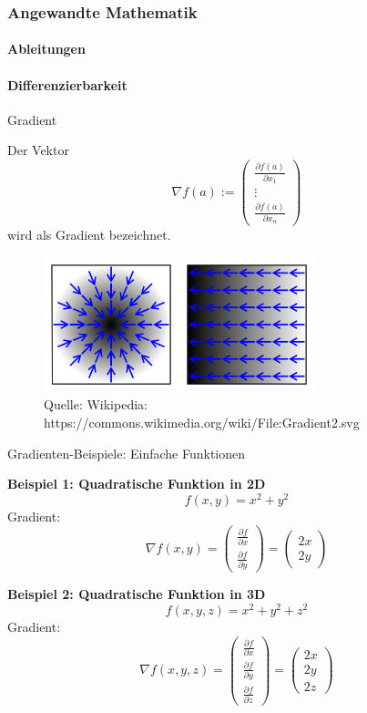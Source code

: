 \documentclass{beamer}
\begin{document}
     \begin{frame}
        \frametitle{Angewandte Mathematik}
        \framesubtitle{Ableitungen}
        
    \framesubtitle{Differenzierbarkeit}
        \begin{block}{Gradient}
    
    Der Vektor 
    $$\nabla f (a) := \begin{pmatrix}  \frac{\partial f(a)}{\partial x_1} \\  \vdots \\ \frac{\partial f(a)}{\partial x_n}  \end{pmatrix}$$
    wird als Gradient bezeichnet. 
    \end{block}
    \begin{figure}[H]
          \centering
        \includegraphics[width=0.7\textwidth]{images/Gradient}
          \caption{Quelle: Wikipedia: https://commons.wikimedia.org/wiki/File:Gradient2.svg}
    \end{figure}
    
    
     \end{frame}
    

\begin{frame}{Gradienten-Beispiele: Einfache Funktionen}

    \textbf{Beispiel 1: Quadratische Funktion in 2D}
    \[
    f(x, y) = x^2 + y^2
    \]
    Gradient:
    \[
    \nabla f(x, y) = 
    \begin{pmatrix}
    \frac{\partial f}{\partial x} \\
    \frac{\partial f}{\partial y}
    \end{pmatrix}
    = 
    \begin{pmatrix}
    2x \\
    2y
    \end{pmatrix}
    \]
    
    \textbf{Beispiel 2: Quadratische Funktion in 3D}
    \[
    f(x, y, z) = x^2 + y^2 + z^2
    \]
    Gradient:
    \[
    \nabla f(x, y, z) = 
    \begin{pmatrix}
    \frac{\partial f}{\partial x} \\
    \frac{\partial f}{\partial y} \\
    \frac{\partial f}{\partial z}
    \end{pmatrix}
    = 
    \begin{pmatrix}
    2x \\
    2y \\
    2z
    \end{pmatrix}
    \]
    
    \end{frame}
    
\end{document}

